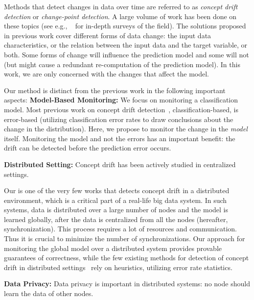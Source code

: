 Methods that detect changes in data over time are referred to as {\em concept drift detection} or {\em change-point detection}.
A large volume of work has been done on these topics
(see e.g., ~\cite{basseville1993detection,brodsky2013nonparametric,ChenGupta2000,Tsymbal,Gama2014}
for in-depth surveys of the field).
The solutions proposed in previous work cover different forms of data change:
the input data characteristics, or the relation between the input data and the target variable, or both.
Some forms of change will influence the prediction model and some will not
(but might cause a redundant re-computation of the prediction model).
In this work, we are only concerned with the changes that affect the model.

Our method is distinct from the previous work in the following important aspects:
\noindent \textbf{Model-Based Monitoring:} We focus on monitoring a classification model.
Most previous work on concept drift detection~\cite{baena2006early,gama2004learning,Nishida2007},
classification-based, is error-based  (utilizing classification error rates to
draw conclusions about the change in the distribution).
Here, we propose to monitor the change in the {\em model} itself.
Monitoring the model and not the errors has an important benefit: the drift can
be detected before the prediction error occurs.

\noindent \textbf{Distributed Setting:} Concept drift has been actively studied in centralized settings.

    Our is one of the very few works \cite{AngGZPH13} that detects concept drift in a distributed
    environment, which is a critical part of a real-life big data system.
    In such systems, data is distributed over a large number of nodes and the model is learned
    globally, after the data is centralized from all the nodes (hereafter, synchronization).
    This process requires a lot of resources and communication.
    Thus it is crucial to minimize the number of synchronizations.
    Our approach for monitoring the global model over a distributed system
    provides provable guarantees of correctness, while the few existing methods for detection of concept
    drift in distributed settings~\cite{AngGZPH13} rely on heuristics, utilizing error rate statistics.

\noindent \textbf{Data Privacy:} Data privacy is important in distributed systems: no node should learn the data of other nodes.


